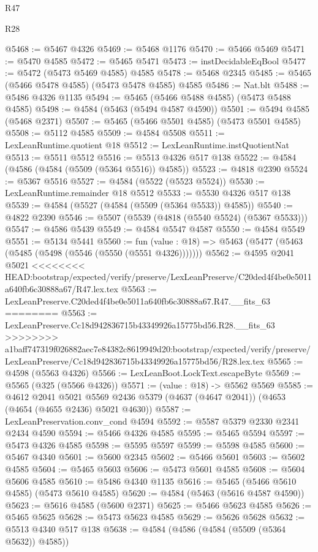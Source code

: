 \begin{lexlean}{R47}
\begin{lexlean}{R28}
\begin{coremodule}
{{{{{{{{{{{{{{{{{{{{{{{{{{{{{{{{{{{{{{{{{{{{{{{{{{{{{{{{{{{{{{{{{{{{{{{{{{{{{{{{{{{{{{{{{{{{{{{{{{{{{{{{{{{{{{{{{{{{{{{{{{{{{{{{{{{{{@5468 := @5467 @4326
@5469 := @5468 @1176
@5470 := @5466 @5469
@5471 := @5470 @4585
@5472 := @5465 @5471
@5473 := instDecidableEqBool
@5477 := @5472 (@5473 @5469 @4585) @4585
@5478 := @5468 @2345
@5485 := @5465 (@5466 @5478 @4585) (@5473 @5478 @4585) @4585
@5486 := Nat.blt
@5488 := @5486 @4326 @1135
@5494 := @5465 (@5466 @5488 @4585) (@5473 @5488 @4585)
@5498 := @4584 (@5463 (@5494 @4587 @4590))
@5501 := @5494 @4585 (@5468 @2371)
@5507 := @5465 (@5466 @5501 @4585) (@5473 @5501 @4585)
@5508 := @5112 @4585
@5509 := @4584 @5508
@5511 := LexLeanRuntime.quotient @18
@5512 := LexLeanRuntime.instQuotientNat
@5513 := @5511 @5512
@5516 := @5513 @4326 @517 @138
@5522 := @4584 (@4586 (@4584 (@5509 (@5364 @5516)) @4585))
@5523 := @4818 @2390
@5524 := @5367 @5516
@5527 := @4584 (@5522 (@5523 @5524))
@5530 := LexLeanRuntime.remainder @18 @5512
@5533 := @5530 @4326 @517 @138
@5539 := @4584 (@5527 (@4584 (@5509 (@5364 @5533)) @4585))
@5540 := @4822 @2390
@5546 := @5507 (@5539 (@4818 (@5540 @5524) (@5367 @5533)))
@5547 := @4586 @5439
@5549 := @4584 @5547 @4587
@5550 := @4584 @5549
@5551 := @5134 @5441
@5560 := fun (value : @18) => @5463 (@5477 (@5463 (@5485 (@5498 (@5546 (@5550 (@5551 @4326)))))))
@5562 := @4595 @2041 @5021
<<<<<<<< HEAD:bootstrap/expected/verify/preserve/LexLeanPreserve/C20ded4f4be0e5011a640fb6c30888a67/R47.lex.tex
@5563 := LexLeanPreserve.C20ded4f4be0e5011a640fb6c30888a67.R47.__fits_63
========
@5563 := LexLeanPreserve.Cc18d942836715b43349926a15775bd56.R28.__fits_63
>>>>>>>> a1baff747319f026882aec7e84382c8619949d20:bootstrap/expected/verify/preserve/LexLeanPreserve/Cc18d942836715b43349926a15775bd56/R28.lex.tex
@5565 := @4598 (@5563 @4326)
@5566 := LexLeanBoot.LockText.escapeByte
@5569 := @5565 (@325 (@5566 @4326))
@5571 := (value : @18) -> @5562 @5569
@5585 := @4612
    @2041
    @5021
    @5569
    @2436
    @5379
    (@4637 (@4647 @2041))
    (@4653 (@4654 (@4655 @2436) @5021 @4630))
@5587 := LexLeanPreservation.conv_cond @4594
@5592 := @5587 @5379 @2330 @2341 @2434 @4590
@5594 := @5466 @4326 @4585
@5595 := @5465 @5594
@5597 := @5473 @4326 @4585
@5598 := @5595 @5597
@5599 := @5598 @4585
@5600 := @5467 @4340
@5601 := @5600 @2345
@5602 := @5466 @5601
@5603 := @5602 @4585
@5604 := @5465 @5603
@5606 := @5473 @5601 @4585
@5608 := @5604 @5606 @4585
@5610 := @5486 @4340 @1135
@5616 := @5465 (@5466 @5610 @4585) (@5473 @5610 @4585)
@5620 := @4584 (@5463 (@5616 @4587 @4590))
@5623 := @5616 @4585 (@5600 @2371)
@5625 := @5466 @5623 @4585
@5626 := @5465 @5625
@5628 := @5473 @5623 @4585
@5629 := @5626 @5628
@5632 := @5513 @4340 @517 @138
@5638 := @4584 (@4586 (@4584 (@5509 (@5364 @5632)) @4585))
}}}}}}}}}}}}}}}}}}}}}}}}}}}}}}}}}}}}}}}}}}}}}}}}}}}}}}}}}}}}}}}}}}}}}}}}}}}}}}}}}}}}}}}}}}}}}}}}}}}}}}}}}}}}}}}}}}}}}}}}}}}}}}}}}}}}}
\end{coremodule}
\end{lexlean}
\end{lexlean}
